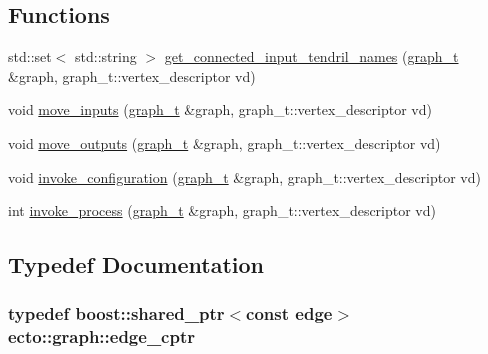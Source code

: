 \subsection*{Functions}
\begin{DoxyCompactItemize}
\item 
std\+::set$<$ std\+::string $>$ \hyperlink{namespaceecto_1_1graph_a3313c6217262c9d746a5f80d0a4708d7}{get\+\_\+connected\+\_\+input\+\_\+tendril\+\_\+names} (\hyperlink{structecto_1_1graph_1_1graph__t}{graph\+\_\+t} \&graph, graph\+\_\+t\+::vertex\+\_\+descriptor vd)
\item 
void \hyperlink{namespaceecto_1_1graph_a6a06bfc5757345d0a4531988e8125197}{move\+\_\+inputs} (\hyperlink{structecto_1_1graph_1_1graph__t}{graph\+\_\+t} \&graph, graph\+\_\+t\+::vertex\+\_\+descriptor vd)
\item 
void \hyperlink{namespaceecto_1_1graph_a540b97ac69ca6f09dfe9a60e1ebd5a1e}{move\+\_\+outputs} (\hyperlink{structecto_1_1graph_1_1graph__t}{graph\+\_\+t} \&graph, graph\+\_\+t\+::vertex\+\_\+descriptor vd)
\item 
void \hyperlink{namespaceecto_1_1graph_a13df50b98a1c4fe0d35ce7a3ea7316e1}{invoke\+\_\+configuration} (\hyperlink{structecto_1_1graph_1_1graph__t}{graph\+\_\+t} \&graph, graph\+\_\+t\+::vertex\+\_\+descriptor vd)
\item 
int \hyperlink{namespaceecto_1_1graph_a0b293971d5460ed370597d2e7c5d0b9c}{invoke\+\_\+process} (\hyperlink{structecto_1_1graph_1_1graph__t}{graph\+\_\+t} \&graph, graph\+\_\+t\+::vertex\+\_\+descriptor vd)
\end{DoxyCompactItemize}


\subsection{Typedef Documentation}
\subsubsection[{\texorpdfstring{edge\+\_\+cptr}{edge_cptr}}]{\setlength{\rightskip}{0pt plus 5cm}typedef boost\+::shared\+\_\+ptr$<$const {\bf edge}$>$ {\bf ecto\+::graph\+::edge\+\_\+cptr}}\hypertarget{namespaceecto_1_1graph_ac45fa43674f9071675a1ebbf4d021eb4}{}\label{namespaceecto_1_1graph_ac45fa43674f9071675a1ebbf4d021eb4}
